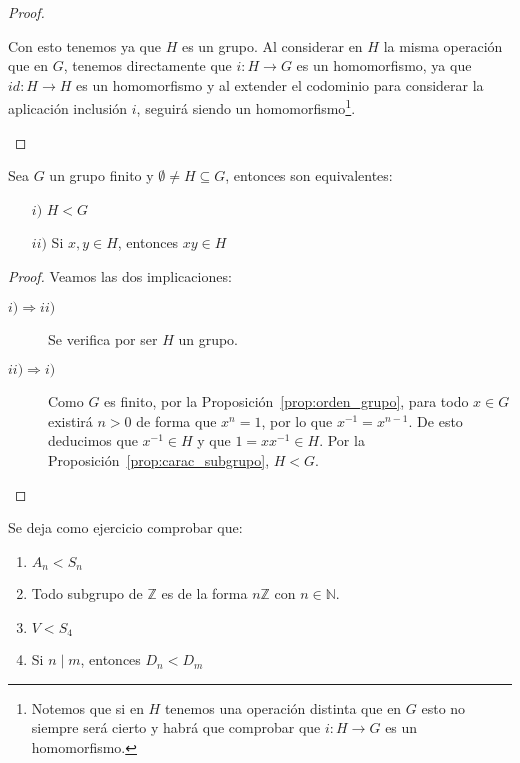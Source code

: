 \begin{prop}
\begin{proof}
\begin{description}
                Con esto tenemos ya que $H$ es un grupo. Al considerar en $H$ la misma operación que en $G$, tenemos directamente que $i:H\to G$ es un homomorfismo, ya que $id:H\to H$ es un homomorfismo y al extender el codominio para considerar la aplicación inclusión $i$, seguirá siendo un homomorfismo\footnote{Notemos que si en $H$ tenemos una operación distinta que en $G$ esto no siempre será cierto y habrá que comprobar que $i:H\to G$ es un homomorfismo.}.
        \end{description}
    \end{proof}
\end{prop}

\begin{prop}
    Sea $G$ un grupo finito y $\emptyset \neq H \subseteq G$, entonces son equivalentes:
    \begin{enumerate}
        \item[$i)$] $H < G$
        \item[$ii)$] Si $x,y\in H$, entonces $xy\in H$
    \end{enumerate}
    \begin{proof}
        Veamos las dos implicaciones:
        \begin{description}
            \item [$i)\Longrightarrow ii)$] Se verifica por ser $H$ un grupo.
            \item [$ii)\Longrightarrow i)$] Como $G$ es finito, por la Proposición~\ref{prop:orden_grupo}, para todo $x\in G$ existirá $n>0$ de forma que $x^n = 1$, por lo que $x^{-1} = x^{n-1}$. De esto deducimos que $x^{-1}\in H$ y que $1=xx^{-1}\in H$. Por la Proposición~\ref{prop:carac_subgrupo}, $H<G$.
        \end{description}
    \end{proof}
\end{prop}

\begin{ejemplo}
    Se deja como ejercicio comprobar que:
    \begin{enumerate}
        \item $A_n < S_n$
        \item Todo subgrupo de $\mathbb{Z}$ es de la forma $n\mathbb{Z}$ con $n\in \mathbb{N}$.
        \item $V<S_4$
        \item Si $n\mid m$, entonces $D_n < D_m$
    \end{enumerate}
\end{ejemplo}

